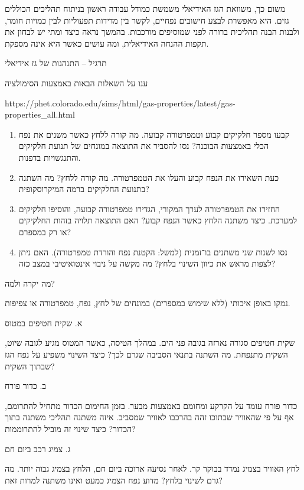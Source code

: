 \documentclass[
  hebrew,
  letterpaper,
  DIV=11,
  numbers=noendperiod]{scrreprt}
\providecommand{\tightlist}{%
  \setlength{\itemsep}{0pt}\setlength{\parskip}{0pt}}
\begin{document}
משום כך, משוואת הגז האידיאלי משמשת כמודל עבודה ראשון בניתוח תהליכים
הכוללים גזים. היא מאפשרת לבצע חישובים נפחיים, לקשר בין מדידות תפעוליות
לבין כמויות חומר, ולבנות הבנה תהליכית ברורה לפני שמוסיפים מורכבות. בהמשך
נראה כיצד ומתי יש לבחון את תקפות ההנחה האידיאלית, ומה עושים כאשר היא
אינה מספקת.

תרגיל -- התנהגות של גז אידיאלי

ענו על השאלות הבאות באמצעות הסימולציה

https://phet.colorado.edu/sims/html/gas-properties/latest/gas-properties\_all.html

\begin{enumerate}
\def\labelenumi{\arabic{enumi}.}
\tightlist
\item
  קבעו מספר חלקיקים קבוע וטמפרטורה קבועה. מה קורה ללחץ כאשר משנים את נפח
  הכלי באמצעות הבוכנה? נסו להסביר את התוצאה במונחים של תנועת חלקיקים
  והתנגשויות בדפנות.\\
\item
  כעת השאירו את הנפח קבוע והעלו את הטמפרטורה. מה קורה ללחץ? מה השתנה
  בתנועת החלקיקים ברמה המיקרוסקופית?\\
\item
  החזירו את הטמפרטורה לערך המקורי, הגדירו טמפרטורה קבועה, והוסיפו
  חלקיקים למערכת. כיצד משתנה הלחץ כאשר הנפח קבוע? האם התוצאה תלויה בזהות
  החלקיקים או רק במספרם?\\
\item
  נסו לשנות שני משתנים בו־זמנית (למשל: הקטנת נפח והורדת טמפרטורה). האם
  ניתן לצפות מראש את כיוון השינוי בלחץ? מה מקשה על ניבוי אינטואיטיבי
  במצב כזה?
\end{enumerate}

מה יקרה ולמה?

נמקו באופן איכותי (ללא שימוש במספרים) במונחים של לחץ, נפח, טמפרטורה או
צפיפות.

א. שקית חטיפים במטוס

שקית חטיפים סגורה נארזה בגובה פני הים. במהלך הטיסה, כאשר המטוס מגיע
לגובה שיוט, השקית מתנפחת. מה השתנה בתנאי הסביבה שגרם לכך? כיצד השינוי
משפיע על נפח הגז שבתוך השקית?

ב. כדור פורח

כדור פורח עומד על הקרקע ומחומם באמצעות מבער. בזמן החימום הכדור מתחיל
להתרומם, אף על פי שהאוויר שבתוכו זהה בהרכבו לאוויר שמסביב. איזה משתנה
תהליכי משתנה בתוך הכדור? כיצד שינוי זה מוביל להתרוממות?

ג. צמיג רכב ביום חם

לחץ האוויר בצמיג נמדד בבוקר קר. לאחר נסיעה ארוכה ביום חם, הלחץ בצמיג
גבוה יותר. מה גרם לשינוי בלחץ? מדוע נפח הצמיג כמעט ואינו משתנה למרות
זאת?
\end{document}
